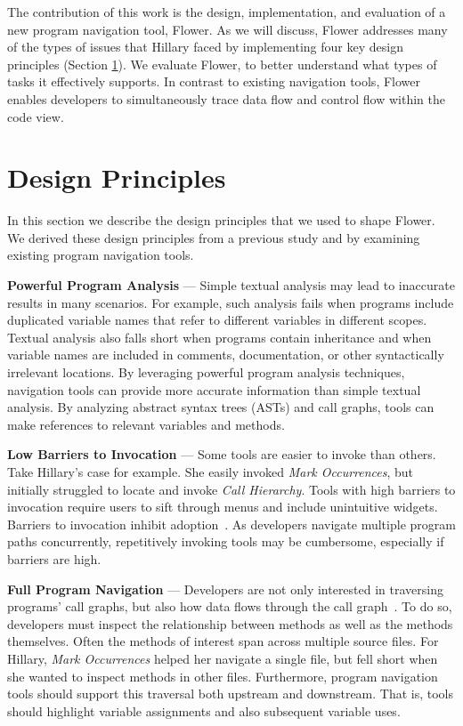 \documentclass[conference]{IEEEtran}
\begin{document}
The contribution of this work is the design, implementation, and evaluation of a new program navigation tool, Flower.
As we will discuss, Flower  addresses many of the types of issues that Hillary faced by implementing four key design principles (Section \ref{DesignPrinciples}).
We evaluate Flower, to better understand what types of tasks it effectively supports. 
In contrast to existing navigation tools, Flower  enables developers to simultaneously trace data flow and control flow within the code view. 


\section{Design Principles}
\label{DesignPrinciples}
In this section we describe the design principles that we used to shape Flower. We derived these design principles from a previous study \cite{Smith2015} and by examining existing program navigation tools.
 
\vspace{1em} 
\noindent\textbf{Powerful Program Analysis} ---
Simple textual analysis may lead to inaccurate results in many scenarios. For example, such analysis fails when programs include duplicated variable names that refer to different variables in different scopes. Textual analysis also falls short when programs contain inheritance and when variable names are included in comments, documentation, or other syntactically irrelevant locations.
By leveraging powerful program analysis techniques, navigation tools can provide more accurate information than simple textual analysis.
By analyzing abstract syntax trees (ASTs) and call graphs, tools can make references to relevant variables and methods. 

\vspace{1em} 
\noindent\textbf{Low Barriers to Invocation} ---
Some tools are easier to invoke than others. 
Take Hillary's case for example.
She easily invoked \emph{Mark Occurrences}, but initially struggled to locate and invoke \emph{Call Hierarchy}.
Tools with high barriers to invocation require users to sift through menus and include unintuitive widgets. 
Barriers to invocation inhibit adoption~\cite{johnson2013don}.
As developers navigate multiple program paths concurrently, repetitively invoking tools may be cumbersome, especially if barriers are high. 


\vspace{1em} 
\noindent\textbf{Full Program Navigation}  ---
Developers are not only interested in traversing programs' call graphs, but also how data flows through the call graph~\cite{Smith2015}.
To do so, developers must inspect the relationship between methods as well as the methods themselves.
Often the methods of interest span across multiple source files.
For Hillary, \emph{Mark Occurrences} helped her navigate a single file, but fell short when she wanted to inspect methods in other files.
Furthermore, program navigation tools should support this traversal both upstream and downstream. 
That is, tools should highlight variable assignments and also subsequent variable uses. 
\end{document}
